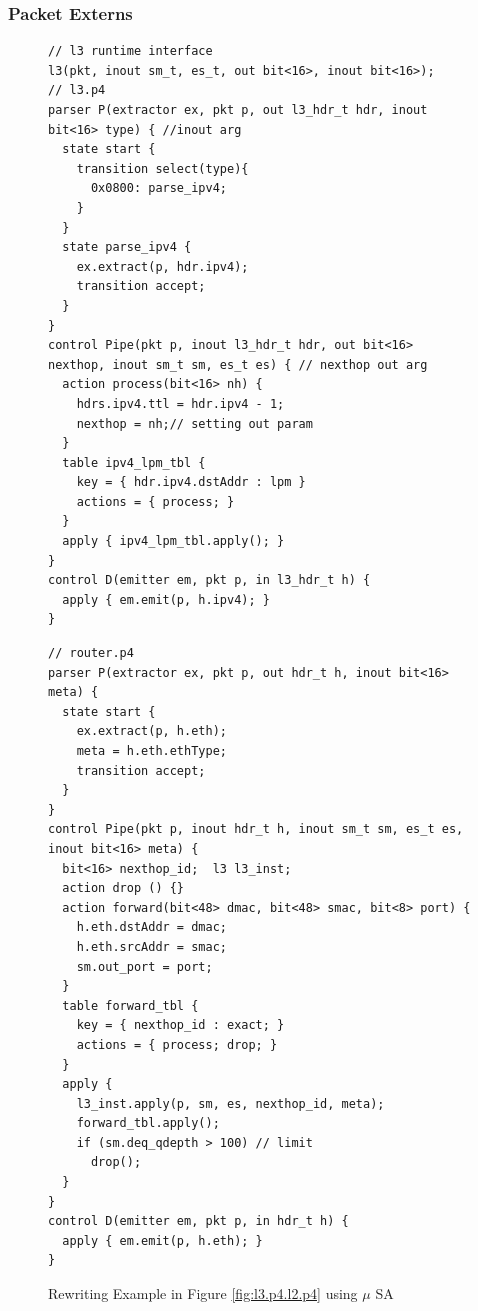 \subsubsection{Packet Externs}
\begin{figure}
\noindent \begin{minipage}[t]{.50\textwidth}
\begin{lstlisting}[frame=none]
// l3 runtime interface
l3(pkt, inout sm_t, es_t, out bit<16>, inout bit<16>);
// l3.p4
parser P(extractor ex, pkt p, out l3_hdr_t hdr, inout bit<16> type) { //inout arg
  state start {
    transition select(type){
      0x0800: parse_ipv4;
    }
  }
  state parse_ipv4 {
    ex.extract(p, hdr.ipv4);
    transition accept;
  }
}
control Pipe(pkt p, inout l3_hdr_t hdr, out bit<16> nexthop, inout sm_t sm, es_t es) { // nexthop out arg
  action process(bit<16> nh) {
    hdrs.ipv4.ttl = hdr.ipv4 - 1;
    nexthop = nh;// setting out param
  }
  table ipv4_lpm_tbl {
    key = { hdr.ipv4.dstAddr : lpm } 
    actions = { process; }
  }
  apply { ipv4_lpm_tbl.apply(); }
}
control D(emitter em, pkt p, in l3_hdr_t h) {
  apply { em.emit(p, h.ipv4); }
}
\end{lstlisting}
\end{minipage}\hspace{-4pt}\vline
\hfill\begin{minipage}[t]{.50\textwidth}
\begin{lstlisting}[frame=none]
// router.p4
parser P(extractor ex, pkt p, out hdr_t h, inout bit<16> meta) {
  state start {
    ex.extract(p, h.eth);
    meta = h.eth.ethType;    
    transition accept;
  }
}
control Pipe(pkt p, inout hdr_t h, inout sm_t sm, es_t es, inout bit<16> meta) {
  bit<16> nexthop_id;  l3 l3_inst;
  action drop () {}           
  action forward(bit<48> dmac, bit<48> smac, bit<8> port) {
    h.eth.dstAddr = dmac;
    h.eth.srcAddr = smac;
    sm.out_port = port;    
  }
  table forward_tbl {
    key = { nexthop_id : exact; } 
    actions = { process; drop; }
  }
  apply {
    l3_inst.apply(p, sm, es, nexthop_id, meta);
    forward_tbl.apply(); 
    if (sm.deq_qdepth > 100) // limit
      drop();
  }
}
control D(emitter em, pkt p, in hdr_t h) {
  apply { em.emit(p, h.eth); }
}
\end{lstlisting}
\end{minipage}
\caption{Rewriting Example in Figure \ref{fig:l3.p4.l2.p4} using $\mu$ SA}
\label{fig:modular-routing}
\end{figure}

